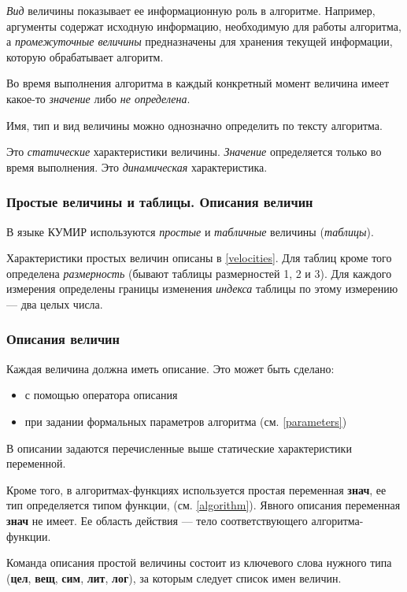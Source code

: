 	\emph{Вид} величины показывает ее информационную роль в алгоритме. Например, аргументы содержат исходную информацию, необходимую для работы алгоритма, а \emph{промежуточные величины} предназначены для хранения текущей информации, которую обрабатывает алгоритм. 

	Во время выполнения алгоритма в каждый конкретный момент величина имеет какое-то \emph{значение} либо \emph{не определена}.

	Имя, тип и вид величины можно однозначно определить по тексту алгоритма.

	Это \emph{статические} характеристики величины. \emph{Значение} определяется только во время выполнения. Это \emph{динамическая} характеристика.

\subsubsection{Простые величины и таблицы. Описания величин}

 В языке КУМИР используются \emph{простые} и \emph{табличные} величины (\emph{таблицы}).

	Характеристики простых величин описаны в \ref{velocities}. Для таблиц кроме того определена \emph{размерность} (бывают таблицы размерностей 1, 2 и 3). Для каждого измерения определены границы изменения \emph{индекса} таблицы по этому измерению --- два целых числа.

\subsubsection{Описания величин}
\label{declarations}

Каждая величина должна иметь описание.  Это может быть сделано:
\begin{itemize}
\item с помощью оператора описания
\item при задании формальных параметров алгоритма (см. \ref{parameters})
\end{itemize}

В описании задаются перечисленные выше статические характеристики переменной.

Кроме того, в алгоритмах-функциях используется простая переменная \textbf{знач}, ее тип определяется типом функции, (см. \ref{algorithm}). Явного описания переменная \textbf{знач} не имеет. Ее область действия --- тело соответствующего алгоритма-функции.

Команда описания простой величины состоит из ключевого слова нужного типа (\textbf{цел}, \textbf{вещ}, \textbf{сим}, \textbf{лит}, \textbf{лог}), за которым следует список имен величин.

